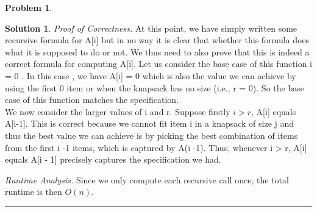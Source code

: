 \documentclass{article}
\theoremstyle{definition}
\newtheorem{problem}{Problem}
\def\fline{\rule{0.75\linewidth}{0.5pt}}
\newcommand{\finishline}{\begin{center}\fline\end{center}}
\newtheorem*{solution*}{Solution}
\newenvironment{solution}{\begin{solution*}}{{\finishline} \end{solution*}}
\begin{document}
\begin{problem}
\begin{enumerate}
\begin{solution}
		\emph{Proof of Correctness.} At this point, we have simply written some recursive formula for A[i] but in no way it is clear that whether this formula does what it is supposed to do or not. We thus need to also prove that this is indeed a correct formula for computing A[i]. Let us consider the base case of this function i = 0 . In this case , we have A[i] = 0 which is also the value we can achieve by using the first 0 item or when the knapsack has no size (i.e., r = 0). So the base case of this function matches the specification. \\
We now consider the larger values of i and r. Suppose firstly $i > r$, A[i] equals A[i-1]. This is correct because we cannot fit item i in a knapsack of size j and thus the best value we can achieve is by picking the best combination of items from the first i -1 items, which is captured by A(i -1). Thus, whenever i > r, A[i] equals A[i - 1] precisely captures the specification we had.

		\emph{Runtime Analysis.} Since we only compute each recursive call once, the total runtime is then $O(n)$.
		
	\end{solution}
	
\end{enumerate}

\end{problem}
\end{document}
